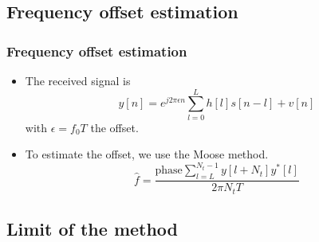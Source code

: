 \documentclass[11pt]{beamer}
\begin{document}
\subsection{Frequency offset estimation}
\begin{frame}
\frametitle{Frequency offset estimation}
\begin{itemize}
\item The received signal is
\begin{equation}
y[n] = e^{j2\pi \epsilon n} \sum_{l=0}^{L}{h[l]s[n-l]+v[n]}
\end{equation}
with $\epsilon = f_0 T$ the offset.
\item To estimate the offset, we use the Moose method.
\begin{equation}
\hat{f} = \frac{\text{phase} \sum_{l=L}^{N_t-1}{y[l+N_t]y^*[l]}}{2\pi N_t T}
\end{equation}

\end{itemize}

\end{frame}

\subsection{Limit of the method}
\end{document}
